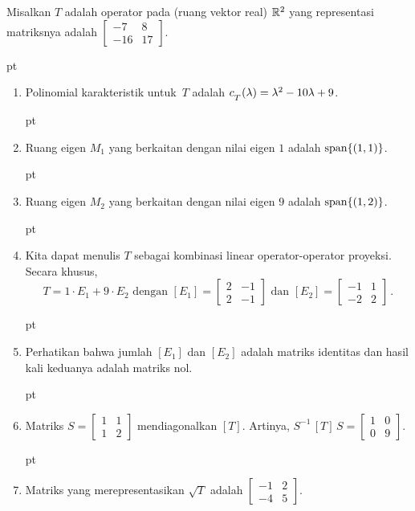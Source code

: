 \begin{exam} Misalkan $T$ adalah operator pada (ruang vektor real) $\mathbb{R}^2$ yang representasi matriksnya
adalah $\begin{bmatrix} -7 &   8 \\ -16 &  17 \end{bmatrix}$.

 pt

 \begin{enumerate}
  \item Polinomial karakteristik untuk~$T$ adalah
                     $c_{{}_{\scriptstyle{T}}}(\lambda) = \lambda^2 - 10\lambda + 9$.

 pt

  \item Ruang eigen $M_1$ yang berkaitan dengan nilai eigen $1$ adalah $\operatorname{span} \{(1,1)\}$.

 pt

  \item Ruang eigen $M_2$ yang berkaitan dengan nilai eigen $9$ adalah $\operatorname{span} \{(1,2)\}$.

 pt

  \item Kita dapat menulis $T$ sebagai kombinasi linear operator-operator proyeksi. Secara khusus,
   \[ T = 1\cdot E_1 + 9\cdot E_2 \text{ dengan } [E_1] = \begin{bmatrix} 2 & -1 \\ 2 & -1 \end{bmatrix}
\text{ dan } [E_2] = \begin{bmatrix} -1 & 1 \\ -2 & 2 \end{bmatrix}\,. \]

 pt

  \item Perhatikan bahwa jumlah $[E_1]$ dan $[E_2]$ adalah matriks identitas dan hasil kali keduanya
adalah matriks nol.

 pt

  \item Matriks $S = \begin{bmatrix} 1 &  1  \\ 1 &  2 \end{bmatrix}$ mendiagonalkan
$[T]$. Artinya, $S^{-1}\,[T]\,S = \begin{bmatrix} 1 &  0  \\ 0 &  9 \end{bmatrix}$.


 pt


  \item Matriks yang merepresentasikan $\sqrt T$ adalah $\begin{bmatrix} -1 &  2  \\ -4 &  5 \end{bmatrix}$.
 \end{enumerate}
\end{exam}

